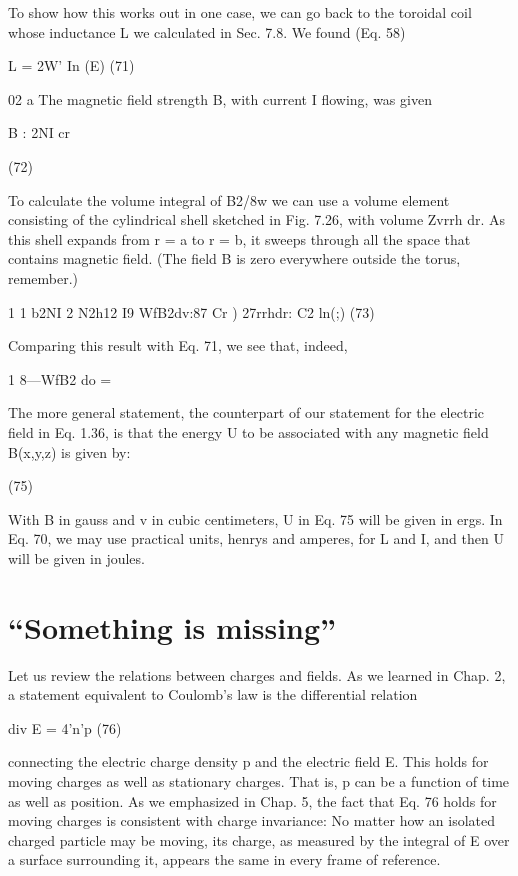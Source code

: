 To show how this works out in one case, we can go back to the
toroidal coil whose inductance L we calculated in Sec. 7.8. We
found (Eq. 58)

L = 2W' In (E) (71)

02 a
The magnetic field strength B, with current I flowing, was given

B : 2NI
cr

(72)

To calculate the volume integral of B2/8w we can use a volume element
consisting of the cylindrical shell sketched in Fig. 7.26, with
volume Zvrrh dr. As this shell expands from r = a to r = b, it sweeps
through all the space that contains magnetic field. (The field B is
zero everywhere outside the torus, remember.)

1 1 b2NI 2 N2h12 I9
WfB2dv:87  Cr ) 27rrhdr: C2 ln(;) (73)

Comparing this result with Eq. 71, we see that, indeed,

1
8---WfB2 do = %

The more general statement, the counterpart of our statement for
the electric field in Eq. 1.36, is that the energy U to be associated with
any magnetic field B(x,y,z) is given by:

(75)

 

With B in gauss and v in cubic centimeters, U in Eq. 75 will be given
in ergs. In Eq. 70, we may use practical units, henrys and amperes,
for L and I, and then U will be given in joules.

\section{``Something is missing''}

Let us review the relations between charges and fields. As we
learned in Chap. 2, a statement equivalent to Coulomb's law is the
differential relation

div E = 4'n'p (76)

connecting the electric charge density p and the electric field E. This
holds for moving charges as well as stationary charges. That is, p can
be a function of time as well as position. As we emphasized in
Chap. 5, the fact that Eq. 76 holds for moving charges is consistent
with charge invariance: No matter how an isolated charged particle
may be moving, its charge, as measured by the integral of E over a
surface surrounding it, appears the same in every frame of reference.

